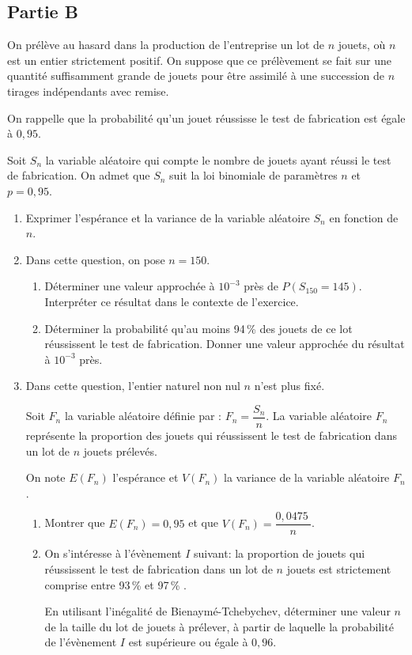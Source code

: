 \documentclass[10pt]{article}
\providecommand{\np}[2][]{{#2~#1}}
\begin{document}
\subsection*{Partie B}

On prélève au hasard dans la production de l'entreprise un lot de $n$ jouets, où $n$ est un entier strictement positif. On suppose que ce prélèvement se fait sur une quantité suffisamment grande de jouets pour être assimilé à une succession de $n$ tirages indépendants avec remise.

On rappelle que la probabilité qu'un jouet réussisse le test de fabrication est égale à $0,95$.

Soit $S_n$ la variable aléatoire qui compte le nombre de jouets ayant réussi le test de fabrication. On
admet que $S_n$ suit la loi binomiale de paramètres $n$ et $p = 0,95$.

\medskip

\begin{enumerate}
\item Exprimer l'espérance et la variance de la variable aléatoire $S_n$ en fonction de $n$.
\item Dans cette question, on pose $n = 150$.
	\begin{enumerate}
		\item Déterminer une valeur approchée à $10^{-3}$ près de $P\left(S_{150} = 145\right)$. Interpréter ce résultat dans le contexte de l'exercice.
		\item Déterminer la probabilité qu'au moins 94\,\% des jouets de ce lot réussissent le test de
fabrication. Donner une valeur approchée du résultat à $10^{-3}$ près.
	\end{enumerate}
\item Dans cette question, l'entier naturel non nul $n$ n'est plus fixé.

Soit $F_n$ la variable aléatoire définie par : $F_n = \dfrac{S_n}{n}$. La variable aléatoire $F_n$ représente la proportion des jouets qui réussissent le test de fabrication dans un lot de $n$ jouets prélevés.

On note $E(F_n)$ l'espérance et $V(F_n)$ la variance de la variable aléatoire $F_n$.
	\begin{enumerate}
		\item Montrer que $E(F_n) = 0,95$ et que $V(F_n) = \dfrac{\np{0,0475}}{n}$.
		\item On s'intéresse à l'évènement $I$ suivant: \og la proportion de jouets qui réussissent le test de fabrication dans un lot de $n$ jouets est strictement comprise entre 93\,\% et 97\,\% \fg.

En utilisant l'inégalité de Bienaymé-Tchebychev, déterminer une valeur $n$ de la taille du lot
de jouets à prélever, à partir de laquelle la probabilité de l'évènement $I$ est supérieure ou égale à $0,96$.
	\end{enumerate}
\end{enumerate}
\end{document}
